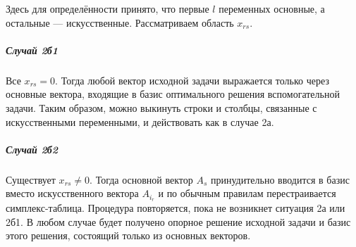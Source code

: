 \documentclass[17pt]{extarticle}
\begin{document}
Здесь для определённости принято, что первые \( l \) переменных основные, а остальные — искусственные. Рассматриваем область \( x_{rs} \).

\subparagraph{Случай 2б1}
Все \( x_{rs} = 0 \). Тогда любой вектор исходной задачи выражается только через основные вектора, входящие в базис оптимального решения вспомогательной задачи. Таким образом, можно выкинуть строки и столбцы, связанные с искусственными переменными, и действовать как в случае 2а.

\subparagraph{Случай 2б2}
Существует \( x_{rs} \ne 0 \). Тогда основной вектор \( A_s \) принудительно вводится в базис вместо искусственного вектора \( A_{i_r} \) и по обычным правилам перестраивается симплекс-таблица. Процедура повторяется, пока не возникнет ситуация 2а или 2б1. В любом случае будет получено опорное решение исходной задачи и базис этого решения, состоящий только из основных векторов.
\end{document}

